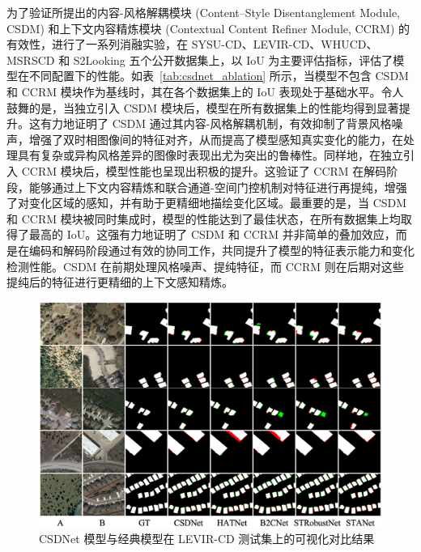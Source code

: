 为了验证所提出的内容-风格解耦模块 (Content–Style Disentanglement Module, CSDM) 和上下文内容精炼模块 (Contextual Content Refiner Module, CCRM) 的有效性，进行了一系列消融实验，在 SYSU-CD、LEVIR-CD、WHUCD、MSRSCD 和 S2Looking 五个公开数据集上，以 IoU 为主要评估指标，评估了模型在不同配置下的性能。如表~\ref{tab:csdnet_ablation} 所示，当模型不包含 CSDM 和 CCRM 模块作为基线时，其在各个数据集上的 IoU 表现处于基础水平。令人鼓舞的是，当独立引入 CSDM 模块后，模型在所有数据集上的性能均得到显著提升。这有力地证明了 CSDM 通过其内容-风格解耦机制，有效抑制了背景风格噪声，增强了双时相图像间的特征对齐，从而提高了模型感知真实变化的能力，在处理具有复杂或异构风格差异的图像时表现出尤为突出的鲁棒性。同样地，在独立引入 CCRM 模块后，模型性能也呈现出积极的提升。这验证了 CCRM 在解码阶段，能够通过上下文内容精炼和联合通道-空间门控机制对特征进行再提纯，增强了对变化区域的感知，并有助于更精细地描绘变化区域。最重要的是，当 CSDM 和 CCRM 模块被同时集成时，模型的性能达到了最佳状态，在所有数据集上均取得了最高的 IoU。这强有力地证明了 CSDM 和 CCRM 并非简单的叠加效应，而是在编码和解码阶段通过有效的协同工作，共同提升了模型的特征表示能力和变化检测性能。CSDM 在前期处理风格噪声、提纯特征，而 CCRM 则在后期对这些提纯后的特征进行更精细的上下文感知精炼。


\begin{figure}[!htbp]
	\centering
	\includegraphics[width=\linewidth]{paper_figures/基于双时相遥感影像风格解缠和内容细化增强遥感变化检测方法/csdnet_levir.png}
    \caption{CSDNet 模型与经典模型在 LEVIR-CD 测试集上的可视化对比结果}
	\label{fig:csdnet_levir}
\end{figure}

